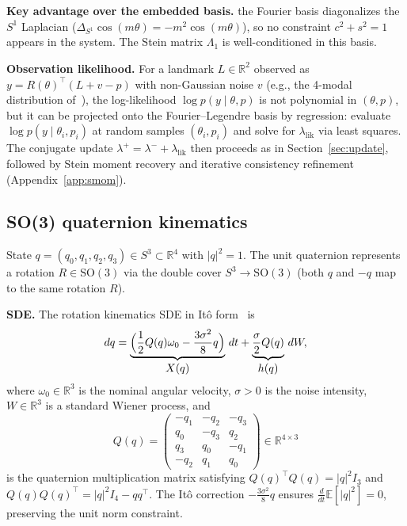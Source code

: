 \documentclass{article}
\newcommand{\R}{\mathbb{R}}
\newcommand{\E}{\mathbb{E}}
\theoremstyle{definition}
\begin{document}
\textbf{Key advantage over the embedded basis.}
the Fourier basis diagonalizes the $S^1$ Laplacian
($\Delta_{S^1}\cos(m\theta) = -m^2\cos(m\theta)$),
so no constraint $c^2 + s^2 = 1$ appears in the system.
The Stein matrix $\Lambda_1$ is well-conditioned in this basis.

\textbf{Observation likelihood.}
For a landmark $L \in \R^2$ observed as
$y = R(\theta)^\top(L + v - p)$ with non-Gaussian noise $v$
(e.g., the 4-modal distribution of~\cite{teng2025}),
the log-likelihood $\log p(y \mid \theta, p)$
is not polynomial in $(\theta, p)$, but it can be projected
onto the Fourier--Legendre basis by regression:
evaluate $\log p(y \mid \theta_i, p_i)$ at random samples
$(\theta_i, p_i)$ and solve for $\lambda_{\mathrm{lik}}$
via least squares.
The conjugate update
$\lambda^+ = \lambda^- + \lambda_{\mathrm{lik}}$
then proceeds as in Section~\ref{sec:update},
followed by Stein moment recovery and iterative
consistency refinement (Appendix~\ref{app:smom}).

\subsection{SO(3) quaternion kinematics}
\label{app:so3-generator}

State $q = (q_0, q_1, q_2, q_3) \in S^3 \subset \R^4$ with $|q|^2 = 1$.
The unit quaternion represents a rotation $R \in \mathrm{SO}(3)$
via the double cover $S^3 \to \mathrm{SO}(3)$
(both $q$ and $-q$ map to the same rotation $R$).

\textbf{SDE.}
The rotation kinematics SDE in It\^o form~\cite{choukroun2006} is
\begin{equation}\label{eq:quat-sde}
    dq = \underbrace{\Bigl(\frac{1}{2}Q(q)\omega_0
    - \frac{3\sigma^2}{8}q\Bigr)}_{\displaystyle X(q)}\,dt
    + \underbrace{\frac{\sigma}{2}Q(q)}_{\displaystyle h(q)}\,dW,
\end{equation}
where $\omega_0 \in \R^3$ is the nominal angular velocity,
$\sigma > 0$ is the noise intensity,
$W \in \R^3$ is a standard Wiener process, and
\begin{equation}\label{eq:Q-mat}
    Q(q) = \begin{pmatrix}
        -q_1 & -q_2 & -q_3 \\
         q_0 & -q_3 &  q_2 \\
         q_3 &  q_0 & -q_1 \\
        -q_2 &  q_1 &  q_0
    \end{pmatrix} \in \R^{4 \times 3}
\end{equation}
is the quaternion multiplication matrix satisfying
$Q(q)^\top Q(q) = |q|^2 I_3$ and $Q(q)Q(q)^\top = |q|^2 I_4 - qq^\top$.
The It\^o correction $-\frac{3\sigma^2}{8}q$ ensures
$\frac{d}{dt}\E[|q|^2] = 0$, preserving the unit norm constraint.
\end{document}
